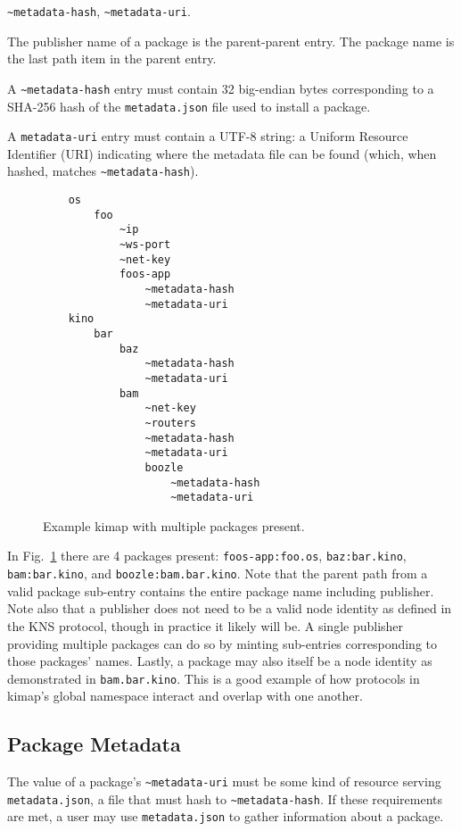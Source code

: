 \documentclass[runningheads]{llncs}
\begin{document}
\verb|~metadata-hash|, \verb|~metadata-uri|.

The publisher name of a package is the parent-parent entry.
The package name is the last path item in the parent entry.

A \verb|~metadata-hash| entry must contain 32 big-endian bytes corresponding to a SHA-256 hash of the \verb|metadata.json| file used to install a package.

A \verb|metadata-uri| entry must contain a UTF-8 string: a Uniform Resource Identifier (URI) indicating where the metadata file can be found (which, when hashed, matches \verb|~metadata-hash|).

\begin{figure}[H]
    \centering
    \begin{verbatim}
    os
        foo
            ~ip
            ~ws-port
            ~net-key
            foos-app
                ~metadata-hash
                ~metadata-uri
    kino
        bar
            baz
                ~metadata-hash
                ~metadata-uri
            bam
                ~net-key
                ~routers
                ~metadata-hash
                ~metadata-uri
                boozle
                    ~metadata-hash
                    ~metadata-uri
    \end{verbatim}
    \caption{Example kimap with multiple packages present.}
    \label{fig:example kimap with packages}
\end{figure}

In Fig.~\ref{fig:example kimap with packages} there are 4 packages present: \verb|foos-app:foo.os|, \verb|baz:bar.kino|, \verb|bam:bar.kino|, and \verb|boozle:bam.bar.kino|.
Note that the parent path from a valid package sub-entry contains the entire package name including publisher.
Note also that a publisher does not need to be a valid node identity as defined in the KNS protocol, though in practice it likely will be.
A single publisher providing multiple packages can do so by minting sub-entries corresponding to those packages' names.
Lastly, a package may also itself be a node identity as demonstrated in \verb|bam.bar.kino|.
This is a good example of how protocols in kimap's global namespace interact and overlap with one another.

\subsection{Package Metadata}
\label{sec:packagemanagermetadata}

The value of a package's \verb|~metadata-uri| must be some kind of resource serving \verb|metadata.json|, a file that must hash to \verb|~metadata-hash|.
If these requirements are met, a user may use \verb|metadata.json| to gather information about a package.
\end{document}
